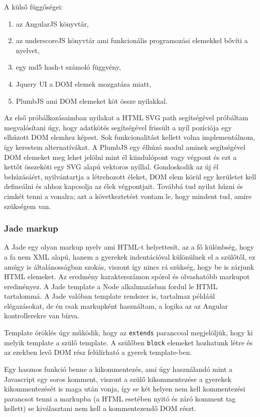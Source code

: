 A külső függőségei: 
\begin{enumerate}
\item az AngularJS könyvtár, 
\item az underscoreJS könyvtár ami funkcionális programozási elemekkel bővíti a nyelvet,
\item egy md5 hash-t számoló függvény,
\item Jquery UI a DOM elemek mozgatása miatt,
\item PlumbJS ami DOM elemeket köt össze nyilakkal.
\end{enumerate}

Az első próbálkozásaimban nyilakat a HTML SVG path segítségével próbáltam megvalósítani úgy, hogy adatkötés segítségével frissült a nyíl pozíciója egy elhúzott DOM elemhez képest. Sok funkcionalitást kellett volna implementálnom, így kerestem alternatívákat. A PlumbJS egy élhúzó modul aminek segítségével DOM elemeket meg lehet jelölni mint él kiindulópont vagy végpont és ezt a kettőt összeköti egy SVG alapú vektoros nyíllal. Gondoskodik az új él behúzásáért, nyilvántartja a létrehozott éleket, DOM elem körül egy kerületet kell defineálni és ahhoz kapcsolja az élek végpontjait. Továbbá tud nyilat húzni és cimkét tenni a vonalra; azt a következtetést vontam le, hogy mindent tud, amire szükségem van.  

\subsubsection{Jade markup}

A Jade egy olyan markup nyelv ami HTML-t helyettesít, az a fő különbség, hogy a fa nem XML alapú, hanem a gyerekek indentációval különülnek el a szülőtől, ez amúgy is általánosságban szokás, viszont így nincs rá szükség, hogy be is zárjunk HTML elemeket. Az eredmény karakterszámon spórol és olvashatóbb markupot eredményez. A Jade template a Node alkalmazásban fordul le HTML tartalommá. A Jade valóban template rendszer is, tartalmaz példáúl elégazásokat, de én csak markupként használtam, a logika az az Angular kontrollerekre van bízva.

Template öröklés úgy működik, hogy az \lstinline{extends} paranccsal megjelöljük, hogy ki melyik template a szülő template. A szülőben \lstinline{block} elemeket hozhatunk létre és az ezekben levő DOM rész felülírható a gyerek template-ben. 

Egy hasznos funkció benne a kikommentezés, ami úgy használandó mint a Javascript egy soros komment, viszont a szülő kikommentezése a gyerekek kikommentezését is maga után vonja, így se két helyen nem kell kommentezési parancsot tenni a markupba (a HTML esetében nyitó és záró komment tag kellett) se kiválasztani nem kell a kommentezendő DOM részt.

